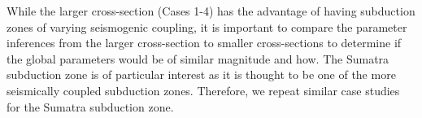 \documentclass[12pt]{article}
\begin{document}
While the larger cross-section (Cases 1-4) has the advantage of having subduction zones of varying seismogenic coupling, it is important to compare the parameter inferences from the larger cross-section to smaller cross-sections to determine if the global parameters would be of similar magnitude and how. The Sumatra subduction zone is of particular interest as it is thought to be one of the more seismically coupled subduction zones. Therefore, we repeat similar case studies for the Sumatra subduction zone.

\begin{figure}[H]
\centering
\hspace{-0.85cm}
\hspace{-0.2cm}
\hspace{-0.2cm}
\hspace{-0.2cm}
\end{figure}
\end{document}
